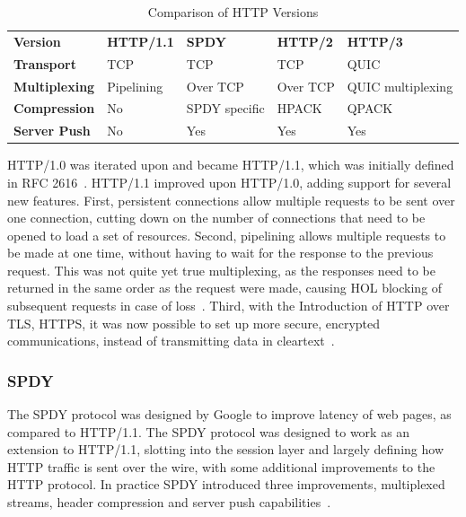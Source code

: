 \documentclass[english, 12pt, a4paper, elec, utf8, a-2b, online]{aaltothesis}
\begin{document}
\begin{table}[h]
	\centering
	\caption{Comparison of HTTP Versions}
	\label{tab:http_versions}
	\begin{tabular}{lllll}
	\textbf{Version} & \textbf{HTTP/1.1} & \textbf{SPDY} & \textbf{HTTP/2} & \textbf{HTTP/3} \\
	\textbf{Transport}    & TCP     & TCP & TCP & QUIC    \\
	\textbf{Multiplexing} & Pipelining    & Over TCP & Over TCP & QUIC multiplexing    \\
	\textbf{Compression}  & No    & SPDY specific & HPACK & QPACK    \\
	\textbf{Server Push} & No & Yes & Yes & Yes \\
	\end{tabular}
\end{table}

HTTP/1.0 was iterated upon and became HTTP/1.1, which was initially defined in
RFC 2616~\cite{rfc2616}. HTTP/1.1 improved upon HTTP/1.0, adding support for several
new features. First, persistent connections allow multiple requests to be sent over one connection,
cutting down on the number of connections that need to be opened to load a set of resources.
Second, pipelining allows multiple requests to be made at one time, without having to wait for the
response to the previous request. This was not quite yet true multiplexing, as the responses
need to be returned in the same order as the request were made, causing HOL blocking
of subsequent requests in case of loss~\cite{rfc2616}. Third, with the Introduction
of HTTP over TLS, HTTPS, it was now possible to set up more secure, encrypted communications,
instead of transmitting data in cleartext~\cite{rfc2818}.
\subsubsection{SPDY}

The SPDY protocol was designed by Google to improve latency of web pages, as compared
to HTTP/1.1. The SPDY protocol was designed to work as an extension to HTTP/1.1,
slotting into the session layer and largely defining how HTTP traffic is sent over the
wire, with some additional improvements to the HTTP protocol. In practice SPDY
introduced three improvements, multiplexed streams, header compression and server push capabilities~\cite{spdy}.
\end{document}
